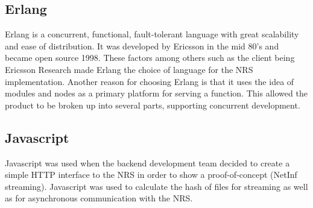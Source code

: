 \subsection{Erlang}
Erlang is a concurrent, functional, fault-tolerant language with great scalability and ease of distribution. It was developed by Ericsson in the mid 80's and became open source 1998.\cite{otpInAction} These factors among others such as the client being Ericsson Research made Erlang the choice of language for the NRS implementation.
Another reason for choosing Erlang is that it uses the idea of modules and nodes as a primary platform for serving a function. This allowed the product to be broken up into several parts, supporting concurrent development.
\subsection{Javascript}
Javascript \cite{javascript} was used when the backend development team decided to create a simple HTTP interface to the NRS in order to show a proof-of-concept (NetInf streaming). Javascript was used to calculate the hash of files for streaming as well as for asynchronous communication with the NRS.
